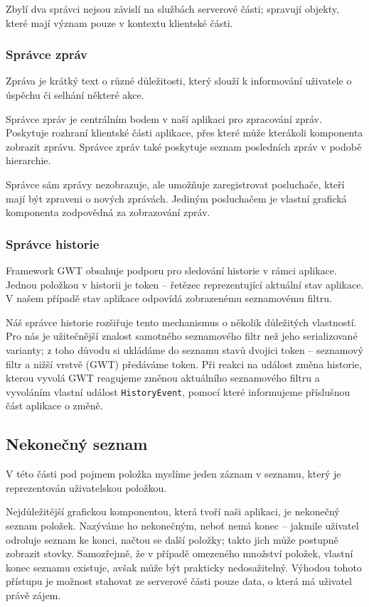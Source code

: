 \bigskip

Zbylí dva správci nejsou závislí na službách serverové části; spravují objekty, které mají význam pouze v kontextu klientské části.

\subsubsection{Správce zpráv}

Zpráva je krátký text o různé důležitosti, který slouží k informování uživatele o úspěchu či selhání některé akce.

Správce zpráv je centrálním bodem v naší aplikaci pro zpracování zpráv.
Poskytuje rozhraní klientské části aplikace, přes které může kterákoli komponenta zobrazit zprávu.
Správce zpráv také poskytuje seznam posledních zpráv v podobě hierarchie.

Správce sám zprávy nezobrazuje, ale umožňuje zaregistrovat posluchače, kteří mají být zpraveni o nových zprávách.
Jediným posluchačem je vlastní grafická komponenta zodpovědná za zobrazování zpráv.


\subsubsection{Správce historie}

Framework GWT obsahuje podporu pro sledování historie v rámci aplikace.
Jednou položkou v historii je token -- řetězec reprezentující aktuální stav aplikace.
V našem případě stav aplikace odpovídá zobrazenému seznamovému filtru.

Náš správce historie rozšiřuje tento mechanismus o několik důležitých vlastností.
Pro nás je užitečnější znalost samotného seznamového filtr než jeho serializované varianty; z toho důvodu si ukládáme do seznamu stavů dvojici token -- seznamový filtr a nižší vrstvě (GWT) předáváme token.
Při reakci na událost změna historie, kterou vyvolá GWT reagujeme změnou aktuálního seznamového filtru a vyvoláním vlastní událost \verb|HistoryEvent|, pomocí které informujeme příslušnou část aplikace o změně.

\subsection{Nekonečný seznam}

V této části pod pojmem položka myslíme jeden záznam v seznamu, který je reprezentován uživatelskou položkou.

Nejdůležitější grafickou komponentou, která tvoří naši aplikaci, je nekonečný seznam položek.
Nazýváme ho nekonečným, neboť nemá konec – jakmile uživatel odroluje seznam ke konci, načtou se další položky; takto jich může postupně zobrazit stovky.
Samozřejmě, že v případě omezeného množství položek, vlastní konec seznamu existuje, avšak může být prakticky nedosažitelný.
Výhodou tohoto přístupu je možnost stahovat ze serverové části pouze data, o která má uživatel právě zájem.

